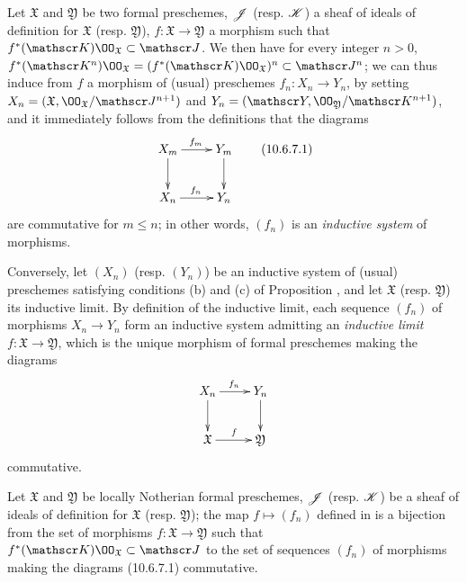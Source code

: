 \begin{env}[10.6.7]
\label{1.10.6.7}
Let $\mathfrak{X}$ and $\mathfrak{Y}$ be two formal preschemes, $\mathscr{J}$ (resp. $\mathscr{K}$) a sheaf of ideals of definition for $\mathfrak{X}$ (resp. $\mathfrak{Y}$), $f:\mathfrak{X}\to\mathfrak{Y}$ a morphism such that $f^*(\sh{K})\OO_\mathfrak{X}\subset\sh{J}$.
We then have for every integer $n>0$, $f^*(\sh{K}^n)\OO_\mathfrak{X}=(f^*(\sh{K})\OO_\mathfrak{X})^n\subset\sh{J}^n$; we can thus  induce from $f$ a morphism of (usual) preschemes $f_n:X_n\to Y_n$, by setting $X_n=(\mathfrak{X},\OO_\mathfrak{X}/\sh{J}^{n+1})$ and $Y_n=(\sh{Y},\OO_\mathfrak{Y}/\sh{K}^{n+1})$, and it immediately follows from the definitions that the diagrams
\[
  \xymatrix{
    X_m\ar[r]^{f_m}\ar[d] &
    Y_m\ar[d]\\
    X_n\ar[r]^{f_n} &
    Y_n
  }
  \tag{10.6.7.1}
\]
are commutative for $m\leq n$; in other words, $(f_n)$ is an \emph{inductive system} of morphisms.
\end{env}

\begin{env}[10.6.8]
\label{1.10.6.8}
Conversely, let $(X_n)$ (resp. $(Y_n)$) be an inductive system of (usual) preschemes satisfying conditions (b) and (c) of Proposition , and let $\mathfrak{X}$ (resp. $\mathfrak{Y}$) its inductive limit.
By definition of the inductive limit, each sequence $(f_n)$ of morphisms $X_n\to Y_n$ form an inductive system admitting an \emph{inductive limit $f:\mathfrak{X}\to\mathfrak{Y}$}, which is the unique morphism of formal preschemes making the diagrams
\[
  \xymatrix{
    X_n\ar[r]^{f_n}\ar[d] &
    Y_n\ar[d]\\
    \mathfrak{X}\ar[r]^f &
    \mathfrak{Y}
  }
\]
commutative.
\end{env}

\begin{prop}[10.6.9]
\label{1.10.6.9}
Let $\mathfrak{X}$ and $\mathfrak{Y}$ be locally Notherian formal preschemes, $\mathscr{J}$ (resp. $\mathscr{K}$) be a sheaf of ideals of definition for $\mathfrak{X}$ (resp. $\mathfrak{Y}$); the map $f\mapsto(f_n)$ defined in  is a bijection from the set of morphisms $f:\mathfrak{X}\to\mathfrak{Y}$ such that $f^*(\sh{K})\OO_\mathfrak{X}\subset\sh{J}$ to the set of sequences $(f_n)$ of morphisms making the diagrams (10.6.7.1) commutative.
\end{prop}

